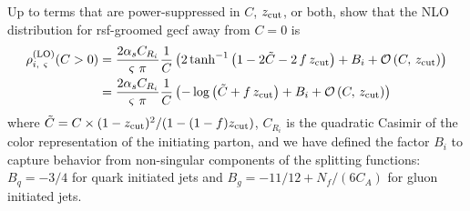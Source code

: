 \begin{exercise}
    \label{ex:rsf-gecf}
    Up to terms that are power-suppressed in \(C\), \(z_{\rm cut}\), or both, show that the NLO distribution for \gls{rsf}-groomed \gls{gecf} away from \(C = 0\) is
    \label{eq:prsf_NLO_1}
    \begin{align}
        \rho^{\rm(LO)}_{i,~\varsigma}(C>0)
        &=
        \frac{2\alpha_s C_{R_i}}{\varsigma~\pi}
        \frac{1}{C}
        \left(
            2\tanh^{-1}\left(1  -2 \tilde C - 2\,f\,z_{\rm cut}\right)
            + B_i
            +
            \mathcal{O}\left(C,\,z_{\rm cut}\right)
        \right)
        \\
        &=
        \frac{2\alpha_s C_{R_i}}{\varsigma~\pi}
        \frac{1}{C}
        \left(
            -\log\left(\tilde C + f\,z_{\rm cut}\right)
            + B_i
            +
            \mathcal{O}\left(C,\,z_{\rm cut}\right)
        \right)
    \end{align}
    where \(\tilde C = C \times (1-z_{\rm cut})^2 / (1 - (1-f)z_{\rm cut})\), \(C_{R_i}\) is the quadratic Casimir of the color representation of the initiating parton, and we have defined the factor \(B_i\) to capture behavior from non-singular components of the splitting functions:
    \(B_q = -3/4\) for quark initiated jets and \(B_g = -11/12 + N_f/(6 C_A)\) for gluon initiated jets.
\end{exercise}

